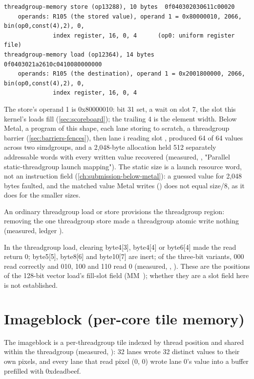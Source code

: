\begin{lstlisting}
threadgroup-memory store (op13288), 10 bytes  0f040302030611c00020
    operands: R105 (the stored value), operand 1 = 0x80000010, 2066, bin(op0,const(4),2), 0,
              index register, 16, 0, 4      (op0: uniform register file)
threadgroup-memory load (op12364), 14 bytes   0f0403021a2610c0410080000000
    operands: R105 (the destination), operand 1 = 0x2001800000, 2066, bin(op0,const(4),2), 0,
              index register, 16, 0, 4
\end{lstlisting}

The store's operand 1 is 0x80000010: bit 31 set, a wait on slot 7, the slot this kernel's loads fill (\cref{sec:scoreboard}); the
trailing 4 is the element width. Below Metal, a program of this shape, each lane storing  to scratch, a
threadgroup barrier (\cref{sec:barriers-fences}), then lane i reading slot , produced 64 of 64 values  across two
simdgroups, and a 2,048-byte allocation held 512 separately addressable words with every written value recovered
(measured, , "Parallel static-threadgroup launch mapping"). The static size is a
launch resource word, not an instruction field (\cref{ch:submission-below-metal}): a guessed value for 2,048 bytes faulted, and the matched
value Metal writes () does not equal size/8, as it does for the smaller sizes.

An ordinary threadgroup load or store provisions the threadgroup region: removing the one threadgroup store
made a threadgroup atomic write nothing (measured, ledger ).

In the threadgroup load, clearing byte4{[}3{]}, byte4{[}4{]} or byte6{[}4{]} made the read return 0;
byte5{[}5{]}, byte8{[}6{]} and byte10{[}7{]} are inert; of the three-bit variants, 000 read correctly and 010, 100 and 110 read 0
(measured, , ). These are the positions of the 128-bit
vector load's fill-slot field (MM~); whether they are a slot field here is not established.

\section{Imageblock (per-core tile memory)}\label{sec:imageblock-per-core-tile}

The imageblock is a per-threadgroup tile indexed by thread position and shared within the threadgroup (measured,
): 32 lanes wrote 32 distinct values to their own pixels, and every lane that read pixel
(0, 0) wrote lane 0's value into a buffer prefilled with 0xdeadbeef.

